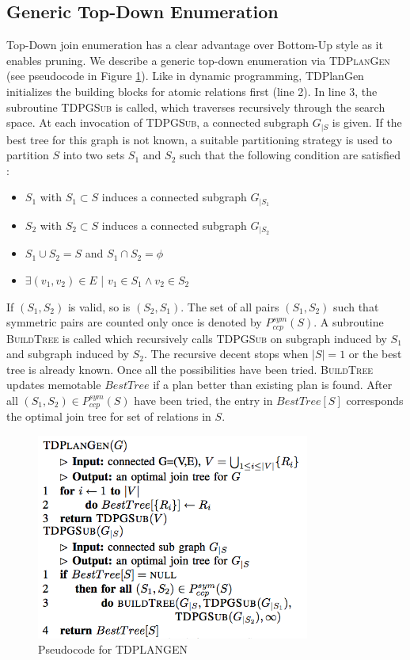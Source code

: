 \subsection{Generic Top-Down Enumeration}
Top-Down join enumeration has a clear advantage over Bottom-Up style as it enables pruning. We describe a generic top-down enumeration via \textsc{TDPlanGen} (see pseudocode in Figure \ref{fig:tdplangen}). Like in dynamic programming, TDPlanGen initializes the building blocks for atomic relations first (line 2). In line 3, the subroutine \textsc{TDPGSub} is called, which traverses recursively through the search space. At each invocation of \textsc{TDPGSub}, a connected subgraph $G_{|S}$ is given. If the best tree for this graph is not known, a suitable partitioning strategy is used to partition $S$ into two sets $S_{1}$ and $S_{2}$ such that the following condition are satisfied :
\begin{itemize}
	\item $S_{1}$ with $S_{1} \subset S$ induces a connected subgraph $G_{|S_{1}}$
	\item $S_{2}$ with $S_{2} \subset S$ induces a connected subgraph $G_{|S_{2}}$
	\item $S_{1} \cup S_{2} = S$ and $S_{1} \cap S_{2} = \phi$
	\item $\exists (v_{1}, v_{2}) \in E$ | $v_{1} \in S_{1} \wedge v_{2} \in S_{2}$
\end{itemize}
If $(S_{1},S_{2})$ is valid, so is $(S_{2},S_{1})$. The set of all pairs $(S_{1},S_{2})$ such that symmetric pairs are counted only once is denoted by $P^{sym}_{ccp}(S)$. A subroutine \textsc{BuildTree} is called which recursively calls \textsc{TDPGSub} on subgraph induced by $S_{1}$ and subgraph induced by $S_{2}$. The recursive decent stops when $|S| = 1$ or the best tree is already known. Once all the possibilities have been tried. \textsc{BuildTree} updates memotable $BestTree$ if a plan better than existing plan is found. After all $(S_{1}, S_{2}) \in P^{sym}_{ccp}(S)$ have been tried, the entry in $BestTree[S]$ corresponds the optimal join tree for set of relations in $S$.

\begin{figure}[here]
\begin{center}
\includegraphics[width=9cm]{Figures/tdplangen.png}
\end{center}
\caption{Pseudocode for TDPLANGEN}
\label{fig:tdplangen}
\end{figure}


